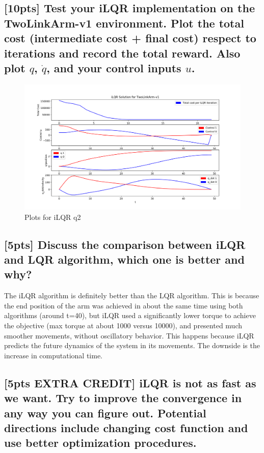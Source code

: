 \documentclass{article}
\begin{document}
\subsection{[10pts] Test your iLQR implementation on the TwoLinkArm-v1 environment. Plot the total cost (intermediate cost + final cost) respect to iterations and record the total reward. Also plot $q$, $\dot{q}$, and your control inputs $u$.}

\begin{figure}[H] \label{fig:ilqr_qn2}
  \centering
  \includegraphics[width=1.2\textwidth]{images/ilqr_qn2}
  \caption{Plots for iLQR q2}
\end{figure}

\subsection{[5pts] Discuss the comparison between iLQR and LQR algorithm, which one is better and why?}

The iLQR algorithm is definitely better than the LQR algorithm. This is because the end position of the arm was achieved in about the same time using both algorithms (around t=40), but iLQR used a significantly lower torque to achieve the objective (max torque at about 1000 versus 10000), and presented much smoother movements, without oscillatory behavior. This happens because iLQR predicts the future dynamics of the system in its movements. The downside is the increase in computational time.

\subsection{[5pts EXTRA CREDIT] iLQR is not as fast as we want. Try to improve the convergence in any way you can figure out. Potential directions include changing cost function and use better optimization procedures.}
\end{document}
